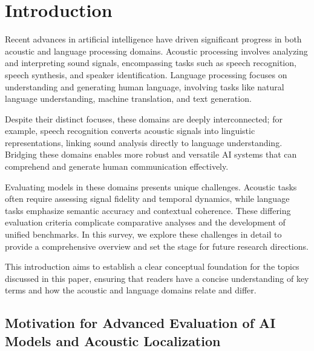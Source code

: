 \documentclass[sigconf]{acmart}
\begin{document}
\maketitle

\section{Introduction}

Recent advances in artificial intelligence have driven significant progress in both acoustic and language processing domains. Acoustic processing involves analyzing and interpreting sound signals, encompassing tasks such as speech recognition, speech synthesis, and speaker identification. Language processing focuses on understanding and generating human language, involving tasks like natural language understanding, machine translation, and text generation.

Despite their distinct focuses, these domains are deeply interconnected; for example, speech recognition converts acoustic signals into linguistic representations, linking sound analysis directly to language understanding. Bridging these domains enables more robust and versatile AI systems that can comprehend and generate human communication effectively.

Evaluating models in these domains presents unique challenges. Acoustic tasks often require assessing signal fidelity and temporal dynamics, while language tasks emphasize semantic accuracy and contextual coherence. These differing evaluation criteria complicate comparative analyses and the development of unified benchmarks. In this survey, we explore these challenges in detail to provide a comprehensive overview and set the stage for future research directions.

This introduction aims to establish a clear conceptual foundation for the topics discussed in this paper, ensuring that readers have a concise understanding of key terms and how the acoustic and language domains relate and differ.

\subsection{Motivation for Advanced Evaluation of AI Models and Acoustic Localization}
\end{document}
